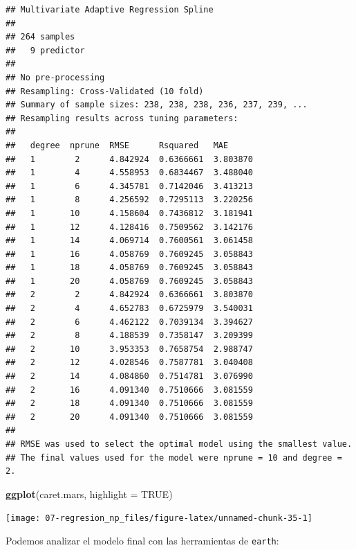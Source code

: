 \documentclass[
]{book}
\newenvironment{Shaded}{\begin{snugshade}}{\end{snugshade}}
\newcommand{\DataTypeTok}[1]{\textcolor[rgb]{0.13,0.29,0.53}{#1}}
\newcommand{\KeywordTok}[1]{\textcolor[rgb]{0.13,0.29,0.53}{\textbf{#1}}}
\newcommand{\NormalTok}[1]{#1}
\newcommand{\OperatorTok}[1]{\textcolor[rgb]{0.81,0.36,0.00}{\textbf{#1}}}
\newcommand{\OtherTok}[1]{\textcolor[rgb]{0.56,0.35,0.01}{#1}}
\theoremstyle{break}
\theoremstyle{definition}
\theoremstyle{definition}
\theoremstyle{definition}
\theoremstyle{remark}
\begin{document}
\begin{verbatim}
## Multivariate Adaptive Regression Spline 
## 
## 264 samples
##   9 predictor
## 
## No pre-processing
## Resampling: Cross-Validated (10 fold) 
## Summary of sample sizes: 238, 238, 238, 236, 237, 239, ... 
## Resampling results across tuning parameters:
## 
##   degree  nprune  RMSE      Rsquared   MAE     
##   1        2      4.842924  0.6366661  3.803870
##   1        4      4.558953  0.6834467  3.488040
##   1        6      4.345781  0.7142046  3.413213
##   1        8      4.256592  0.7295113  3.220256
##   1       10      4.158604  0.7436812  3.181941
##   1       12      4.128416  0.7509562  3.142176
##   1       14      4.069714  0.7600561  3.061458
##   1       16      4.058769  0.7609245  3.058843
##   1       18      4.058769  0.7609245  3.058843
##   1       20      4.058769  0.7609245  3.058843
##   2        2      4.842924  0.6366661  3.803870
##   2        4      4.652783  0.6725979  3.540031
##   2        6      4.462122  0.7039134  3.394627
##   2        8      4.188539  0.7358147  3.209399
##   2       10      3.953353  0.7658754  2.988747
##   2       12      4.028546  0.7587781  3.040408
##   2       14      4.084860  0.7514781  3.076990
##   2       16      4.091340  0.7510666  3.081559
##   2       18      4.091340  0.7510666  3.081559
##   2       20      4.091340  0.7510666  3.081559
## 
## RMSE was used to select the optimal model using the smallest value.
## The final values used for the model were nprune = 10 and degree = 2.
\end{verbatim}

\begin{Shaded}
\begin{Highlighting}[]
\KeywordTok{ggplot}\NormalTok{(caret.mars, }\DataTypeTok{highlight =} \OtherTok{TRUE}\NormalTok{)}
\end{Highlighting}
\end{Shaded}

\begin{center}\texttt{[image: 07-regresion\_np\_files/figure-latex/unnamed-chunk-35-1]} \end{center}

Podemos analizar el modelo final con las herramientas de \texttt{earth}:

\begin{Shaded}
\end{Shaded}
\end{document}
